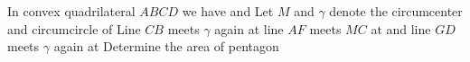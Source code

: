In convex quadrilateral $ABCD$ we have     and  Let $M$ and $\gamma$ denote the circumcenter and circumcircle of  Line $CB$ meets $\gamma$ again at  line $AF$ meets $MC$ at  and line $GD$ meets $\gamma$ again at  Determine the area of pentagon 